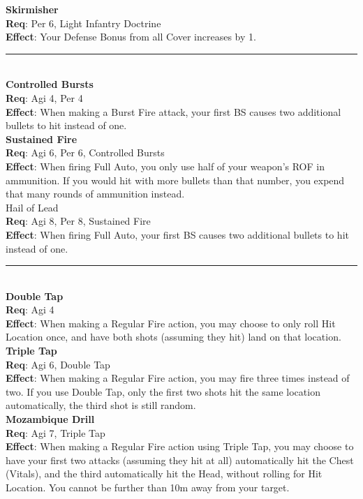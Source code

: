 \documentclass[a4paper, twocolumn, openany]{book}
\newlength{\indentlen}
\newcommand{\tabto}[1]{\setlength{\leftskip}{#1\indentlen}}
\begin{document}
{	\tabto{1}
	{\bfseries Skirmisher}\\
	{\bfseries Req}: Per 6, Light Infantry Doctrine\\
	{\bfseries Effect}: Your Defense Bonus from all Cover increases by 1.\\ \hrule\ \\

\tabto{0}
{\bfseries Controlled Bursts}\\
{\bfseries Req}: Agi 4, Per 4\\
{\bfseries Effect}: When making a Burst Fire attack, your first BS causes two additional bullets to hit
instead of one.\\

	\tabto{1}
	{\bfseries Sustained Fire}\\
	{\bfseries Req}:  Agi 6, Per 6, Controlled Bursts\\
	{\bfseries Effect}: When firing Full Auto, you only use half of your weapon’s ROF in ammunition. If
	you would hit with more bullets than that number, you expend that many rounds of
	ammunition instead.\\

		\tabto{2}
		Hail of Lead\\
		{\bfseries Req}: Agi 8, Per 8, Sustained Fire\\
		{\bfseries Effect}: When firing Full Auto, your first BS causes two additional bullets to hit
		instead of one.\\ \hrule\ \\

\tabto{0}
{\bfseries Double Tap}\\
{\bfseries Req}: Agi 4\\
{\bfseries Effect}: When making a Regular Fire action, you may choose to only roll Hit Location once, and
have both shots (assuming they hit) land on that location.\\

	\tabto{1}
	{\bfseries Triple Tap}\\
	{\bfseries Req}: Agi 6, Double Tap\\
	{\bfseries Effect}: When making a Regular Fire action, you may fire three times instead of two. If
	you use Double Tap, only the first two shots hit the same location automatically, the third shot is
	still random.\\

		\tabto{2}
		{\bfseries Mozambique Drill}\\
		{\bfseries Req}: Agi 7, Triple Tap\\
		{\bfseries Effect}: When making a Regular Fire action using Triple Tap, you may choose to
		have your first two attacks (assuming they hit at all) automatically hit the Chest (Vitals),
		and the third automatically hit the Head, without rolling for Hit Location. You cannot be
		further than 10m away from your target.\\

}
\end{document}
